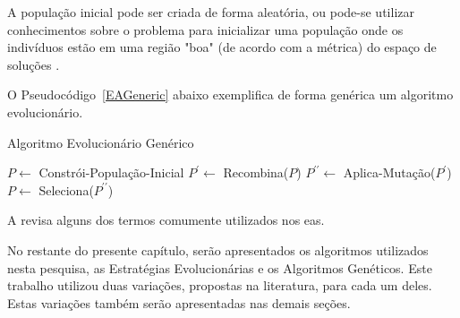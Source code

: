 A população inicial pode ser criada de forma aleatória, ou pode-se utilizar 
conhecimentos sobre o problema para inicializar uma população onde os indivíduos 
estão em uma região "boa" (de acordo com a métrica) do espaço de soluções 
\citep{Luke2013Metaheuristics}.

O Pseudocódigo~\ref{EAGeneric} abaixo exemplifica de forma genérica um algoritmo 
evolucionário.

\begin{algorithm}                      %
	\caption{Algoritmo Evolucionário Genérico}          %
	\label{EAGeneric}                           %
	\begin{algorithmic}                    %
		\State $P \gets $ Constrói-População-Inicial
		\Repeat
			\State $P^{\prime} \gets $ Recombina($P$)
			\State $P^{\prime \prime} \gets $ Aplica-Mutação($P^{\prime}$)
			\State $P \gets $ Seleciona($P^{\prime \prime}$)
		\EndProcedure
	\end{algorithmic}
\end{algorithm}

A  revisa alguns dos termos comumente utilizados nos 
\acp{ea}.

No restante do presente capítulo, serão apresentados os algoritmos utilizados 
nesta pesquisa, as Estratégias Evolucionárias e os Algoritmos Genéticos. Este 
trabalho utilizou duas variações, propostas na literatura, para cada um deles. 
Estas variações também serão apresentadas nas demais seções.

